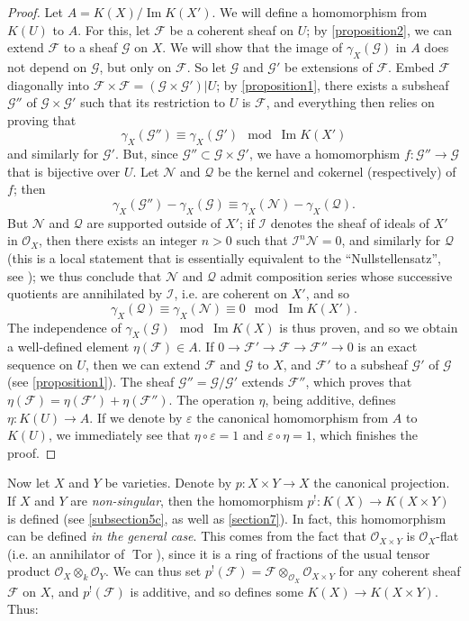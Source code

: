 \documentclass{article}
\theoremstyle{plain}
\theoremstyle{definition}
\newcommand{\sh}[1]{{\mathscr{#1}}}
\DeclareMathOperator{\Tor}{Tor}
\newcommand{\oldpage}[1]{\marginpar{\footnotesize$\Big\vert$ \textit{p.~#1}}}
\begin{document}
\begin{proof}
  Let $A=K(X)/\operatorname{Im} K(X')$.
  We will define a homomorphism from $K(U)$ to $A$.
  For this, let $\sh{F}$ be a coherent sheaf on $U$;
  by \cref{proposition2}, we can extend $\sh{F}$ to a sheaf $\sh{G}$ on $X$.
  We will show that the image of $\gamma_X(\sh{G})$ in $A$ does not depend on $\sh{G}$, but only on $\sh{F}$.
  So let $\sh{G}$ and $\sh{G}'$ be extensions of $\sh{F}$.
  Embed $\sh{F}$ diagonally into $\sh{F}\times\sh{F}=(\sh{G}\times\sh{G}')|U$;
  by \cref{proposition1}, there exists a subsheaf $\sh{G}''$ of $\sh{G}\times\sh{G}'$ such that its restriction to $U$ is $\sh{F}$, and everything then relies on proving that
  \[
    \gamma_X(\sh{G}'') \equiv \gamma_X(\sh{G}') \mod \operatorname{Im}K(X')
  \]
  and similarly for $\sh{G}'$.
  But, since $\sh{G}''\subset\sh{G}\times\sh{G}'$, we have a homomorphism $f\colon\sh{G}''\to\sh{G}$ that is bijective over $U$.
  Let $\sh{N}$ and $\sh{Q}$ be the kernel and cokernel (respectively) of $f$;
  then
  \[
    \gamma_X(\sh{G}'') - \gamma_X(\sh{G})
    \equiv \gamma_X(\sh{N}) - \gamma_X(\sh{Q}).
  \]
  But $\sh{N}$ and $\sh{Q}$ are supported outside of $X'$;
  if $\sh{I}$ denotes the sheaf
\oldpage{116}
  of ideals of $X'$ in $\sh{O}_X$, then there exists an integer $n>0$ such that $\sh{I}^n\sh{N}=0$, and similarly for $\sh{Q}$ (this is a local statement that is essentially equivalent to the ``Nullstellensatz'', see \cite{14});
  we thus conclude that $\sh{N}$ and $\sh{Q}$ admit composition series whose successive quotients are annihilated by $\sh{I}$, i.e. are coherent on $X'$, and so
  \[
    \gamma_X(\sh{Q}) \equiv \gamma_X(\sh{N}) \equiv 0 \mod \operatorname{Im}K(X').
  \]
  The independence of $\gamma_X(\sh{G}) \mod\operatorname{Im}K(X)$ is thus proven, and so we obtain a well-defined element $\eta(\sh{F})\in A$.
  If $0\to\sh{F}'\to\sh{F}\to\sh{F}''\to0$ is an exact sequence on $U$, then we can extend $\sh{F}$ and $\sh{G}$ to $X$, and $\sh{F}'$ to a subsheaf $\sh{G}'$ of $\sh{G}$ (see \cref{proposition1}).
  The sheaf $\sh{G}''=\sh{G}/\sh{G}'$ extends $\sh{F}''$, which proves that $\eta(\sh{F})=\eta(\sh{F}')+\eta(\sh{F}'')$.
  The operation $\eta$, being additive, defines $\eta\colon K(U)\to A$.
  If we denote by $\varepsilon$ the canonical homomorphism from $A$ to $K(U)$, we immediately see that $\eta\circ\varepsilon=1$ and $\varepsilon\circ\eta=1$, which finishes the proof.
\end{proof}

Now let $X$ and $Y$ be varieties.
Denote by $p\colon X\times Y\to X$ the canonical projection.
If $X$ and $Y$ are \emph{non-singular}, then the homomorphism $p^!\colon K(X)\to K(X\times Y)$ is defined (see \cref{subsection5c}, as well as \cref{section7}).
In fact, this homomorphism can be defined \emph{in the general case}.
This comes from the fact that $\sh{O}_{X\times Y}$ is $\sh{O}_X$-flat (i.e. an annihilator of $\Tor$), since it is a ring of fractions of the usual tensor product $\sh{O}_X\otimes_k\sh{O}_Y$.
We can thus set $p^!(\sh{F})=\sh{F}\otimes_{\sh{O}_X}\sh{O}_{X\times Y}$ for any coherent sheaf $\sh{F}$ on $X$, and $p^!(\sh{F})$ is additive, and so defines some $K(X)\to K(X\times Y)$.
Thus:
\end{document}
